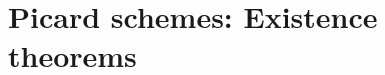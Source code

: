 \chapter{Picard schemes: Existence theorems}\label{fga3.v}



\newpage


\newpage


\newpage


\newpage


\newpage


\newpage


